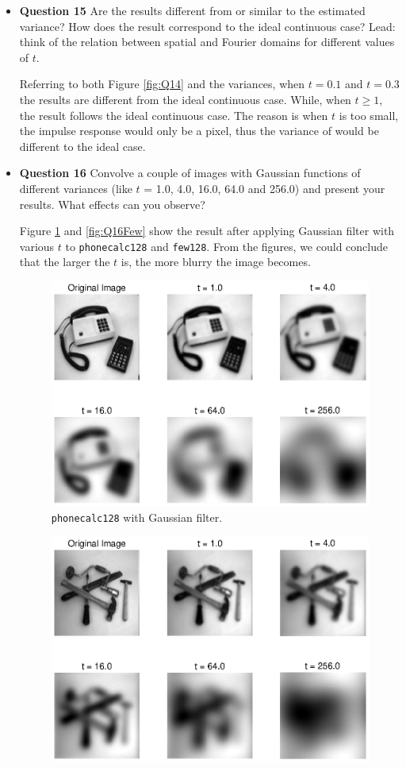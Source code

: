 \documentclass[11pt,a4paper]{article}
\begin{document}
\begin{itemize}
	\item \textbf{Question 15} Are the results different from or similar to the estimated variance? How does the result correspond to the ideal continuous case? Lead: think of the relation between spatial and Fourier domains for different values of $t$.
	\par Referring to both Figure \ref{fig:Q14} and the variances, when $t=0.1$ and $t=0.3$ the results are different from the ideal continuous case. While, when $t \geq 1$, the result follows the ideal continuous case. The reason is when $t$ is too small, the impulse response would only be a pixel, thus the variance of would be different to the ideal case.
	
	\item \textbf{Question 16} Convolve a couple of images with Gaussian functions of different variances (like $t$ = 1.0, 4.0, 16.0, 64.0 and 256.0) and present your results. What effects can you observe?
	\par Figure \ref{fig:Q16Phone} and \ref{fig:Q16Few} show the result after applying Gaussian filter with various $t$ to \texttt{phonecalc128} and \texttt{few128}.	From the figures, we could conclude that the larger the $t$ is, the more blurry the image becomes. 
	\begin{figure}[!ht]
		\footnotesize
		\centering 
		\includegraphics[width=0.8\columnwidth]{Q16_Phone.eps}
		\caption{\texttt{phonecalc128} with Gaussian filter.}
		\label{fig:Q16Phone}
	\end{figure}
	\begin{figure}[!ht]
		\footnotesize
		\centering 
		\includegraphics[width=0.8\columnwidth]{Q16_Few.eps}

\end{figure}
\end{itemize}
\end{document}
